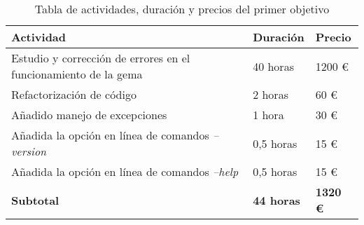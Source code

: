 \begin{table}[!ht]
\begin{center}
\begin{tabular}{|p{80mm}|p{25mm}|p{20mm}|} \hline 
\textbf{Actividad} & \textbf{Duraci\'on} & \textbf{Precio} \\ \hline
Estudio y correcci\'on de errores en el funcionamiento de la gema &
40 horas &
1200 \euro{}
\\
\hline

Refactorizaci\'on de c\'odigo &
2 horas &
60 \euro{}
\\
\hline

A\~{n}adido manejo de excepciones &
1 hora &
30 \euro{}
\\
\hline

A\~{n}adida la opci\'on en l\'inea de comandos \textit{--version} &
0,5 horas &
15 \euro{}
\\
\hline

A\~{n}adida la opci\'on en l\'inea de comandos \textit{--help} &
0,5 horas &
15 \euro{}
\\
\hline \hline

{\bfseries Subtotal} &
{\bfseries 44 horas} &
{\bfseries 1320 \euro{}}
\\
\hline

\end{tabular}
\end{center}
\caption{Tabla de actividades, duraci\'on y precios del primer objetivo}
\label{table:resOthers1}
\end{table}
